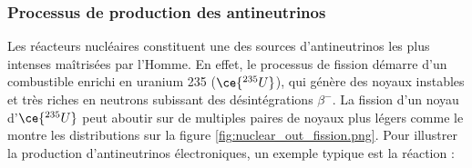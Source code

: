 \subsubsection*{Processus de production des antineutrinos}

Les réacteurs nucléaires constituent une des sources d'antineutrinos les plus intenses maîtrisées par l'Homme. En effet, le processus de fission démarre d'un combustible enrichi en uranium 235 ($\ce{^{235}U}$), qui génère des noyaux instables et très riches en neutrons subissant des désintégrations $\beta^-$. La fission d'un noyau d'$\ce{^{235}U}$ peut aboutir sur de multiples paires de noyaux plus légers comme le montre les distributions sur la figure \ref{fig:nuclear_out_fission.png}. Pour illustrer la production d'antineutrinos électroniques, un exemple typique est la réaction :

